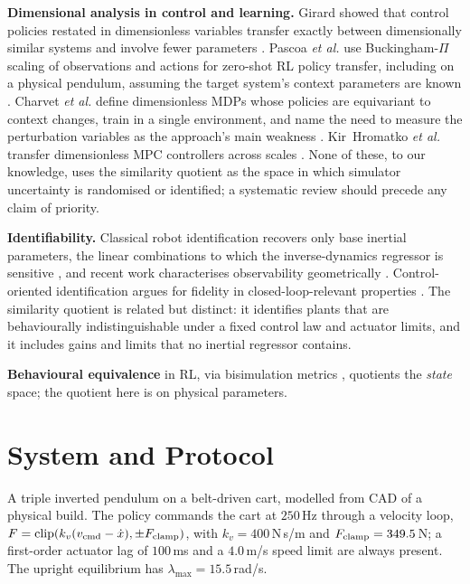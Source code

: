 \documentclass[conference]{IEEEtran}
\begin{document}
\textbf{Dimensional analysis in control and learning.} Girard showed that
control policies restated in dimensionless variables transfer exactly between
dimensionally similar systems and involve fewer parameters \cite{girard2024}.
Pascoa \emph{et al.} use Buckingham-$\Pi$ scaling of observations and actions
for zero-shot RL policy transfer, including on a physical pendulum, assuming
the target system's context parameters are known \cite{pascoa2025}. Charvet
\emph{et al.} define dimensionless MDPs whose policies are equivariant to
context changes, train in a single environment, and name the need to measure
the perturbation variables as the approach's main weakness
\cite{charvet2025}. Kir~Hromatko \emph{et al.} transfer dimensionless MPC
controllers across scales \cite{hromatko2025}. None of these, to our knowledge,
uses the similarity quotient as the space in which simulator uncertainty is
randomised or identified; a systematic review should precede any claim of
priority.

\textbf{Identifiability.} Classical robot identification recovers only base
inertial parameters, the linear combinations to which the inverse-dynamics
regressor is sensitive \cite{gautier1990}, and recent work characterises
observability geometrically \cite{wensing2024}. Control-oriented identification
argues for fidelity in closed-loop-relevant properties
\cite{gevers2005,hjalmarsson2009}. The similarity quotient is related but
distinct: it identifies plants that are behaviourally indistinguishable under a
fixed control law and actuator limits, and it includes gains and limits that no
inertial regressor contains.

\textbf{Behavioural equivalence} in RL, via bisimulation metrics
\cite{ferns2004,castro2020}, quotients the \emph{state} space; the quotient
here is on physical parameters.

\section{System and Protocol}\label{sec:setup}

A triple inverted pendulum on a belt-driven cart, modelled from CAD of a
physical build. The policy commands the cart at $250\,$Hz through a velocity
loop, $F = \mathrm{clip}(k_v(v_{\rm cmd}-\dot x), \pm F_{\rm clamp})$, with
$k_v = 400\,$N\,s/m and $F_{\rm clamp} = 349.5\,$N; a first-order actuator lag
of $100\,$ms and a $4.0\,$m/s speed limit are always present. The upright
equilibrium has $\lambda_{\max} = 15.5\,$rad/s.
\end{document}

